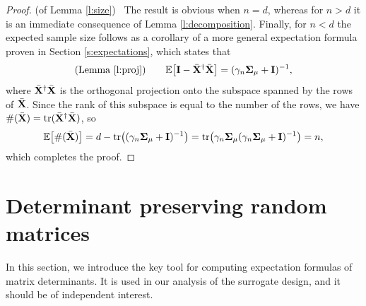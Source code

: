 \documentclass[11pt]{article}
\begin{document}
\begin{proof} (of Lemma \ref{l:size}) \
  The result is obvious when $n=d$, whereas
  for $n>d$ it is an immediate consequence 
  of Lemma \ref{l:decomposition}.
  Finally, for $n<d$ the expected sample
  size follows as a corollary of a more general expectation formula
  proven in Section \ref{s:expectations}, which states that
  \begin{align*}
\text{(Lemma \ref{l:proj})} \qquad\mathbb E\big[\mathbf I - {\bar{\mathbf X}}^\dagger{\bar{\mathbf X}}\big] =
    (\gamma_n\mathbf{\Sigma}_\mu + \mathbf I)^{-1},
  \end{align*}
  where ${\bar{\mathbf X}}^\dagger{\bar{\mathbf X}}$ is the orthogonal projection onto
  the subspace spanned by the rows of ${\bar{\mathbf X}}$. Since the rank of this
  subspace is equal to the number of the rows, we have
  $\#({\bar{\mathbf X}})=\mathrm{tr}({\bar{\mathbf X}}^\dagger{\bar{\mathbf X}})$, so
  \begin{align*}
    \mathbb E\big[\#({\bar{\mathbf X}})\big] = d - \mathrm{tr}\big((\gamma_n\mathbf{\Sigma}_\mu +
    \mathbf I)^{-1}\big) =
    \mathrm{tr}\big(\gamma_n\mathbf{\Sigma}_\mu(\gamma_n\mathbf{\Sigma}_\mu+\mathbf I)^{-1}\big) = n,
  \end{align*}
  which completes the proof.
\end{proof}


\section{Determinant preserving random matrices}
\label{s:dp}

In this section, we introduce the key tool for computing expectation formulas of matrix determinants.
It is used in our analysis of the surrogate design, and it should be of independent interest. 
\end{document}
